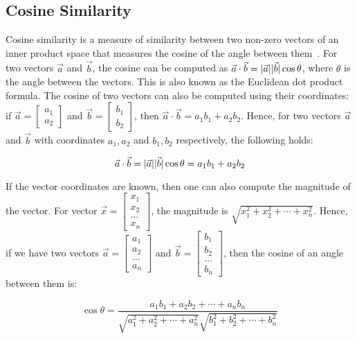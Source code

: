 \documentclass[11pt]{article}
\DeclarePairedDelimiter\abs{\lvert}{\rvert}
\begin{document}
\subsection{Cosine Similarity}

Cosine similarity is a measure of similarity between two non-zero vectors of an
inner product space that measures the cosine of the angle between
them~\cite{wikicosine}. For two vectors \(\vec{a}\) and \(\vec{b}\),
the cosine can be computed as
\(\vec{a} \cdot \vec{b} = \abs{\vec{a}}\abs{\vec{b}}\cos\theta\),
where \(\theta\) is the angle between the vectors. This is also known as the
Euclidean dot product formula.
The cosine of two vectors can also be computed using their coordinates:
if \(\vec{a} = \begin{bmatrix}a_1 \\ a_2\end{bmatrix}\) and
\(\vec{b} = \begin{bmatrix}b_1 \\ b_2\end{bmatrix}\), then
\(\vec{a} \cdot \vec{b} = a_1b_1 + a_2b_2\). Hence, for two vectors \(\vec{a}\)
and \(\vec{b}\) with coordinates \(a_1, a_2\) and \(b_1, b_2\) respectively,
the following holds:

\[\vec{a} \cdot \vec{b} = \abs{\vec{a}}\abs{\vec{b}}\cos\theta = a_1b_1 + a_2b_2\]

\bigskip

If the vector coordinates are known, then one can also compute the magnitude of
the vector. For vector
\(\vec{x} = \begin{bmatrix}x_1 \\ x_2 \\ \dots \\ x_n\end{bmatrix}\),
the magnitude is \(\sqrt{x_1^2 + x_2^2 + \cdots + x_n^2}\). Hence, if we have two
vectors \(\vec{a} = \begin{bmatrix}a_1 \\ a_2 \\ \dots \\ a_n\end{bmatrix}\) and
\(\vec{b} = \begin{bmatrix}b_1 \\ b_2 \\ \dots \\ b_n\end{bmatrix}\), then the
cosine of an angle between them is:

\[ \cos\theta = \dfrac{a_1b_1 + a_2b_2 + \cdots + a_nb_n}{\sqrt{a_1^2 + a_2^2 + \cdots + a_n^2}\sqrt{b_1^2 + b_2^2 + \cdots + b_n^2}} \]
\end{document}

